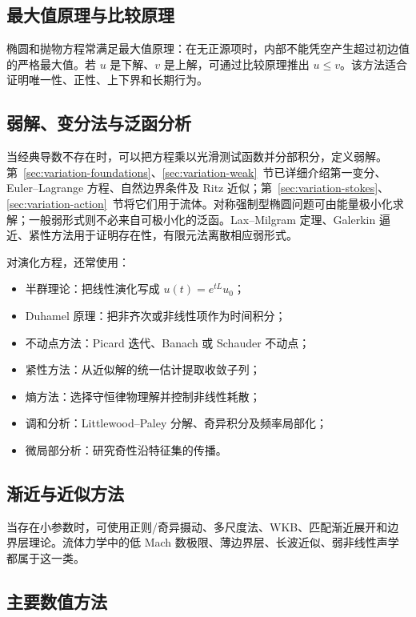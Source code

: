 \documentclass[cn,hazy,blue,11pt,normal]{elegantnote}
\numberwithin{equation}{section}
\begin{document}
\subsection{最大值原理与比较原理}

椭圆和抛物方程常满足最大值原理：在无正源项时，内部不能凭空产生超过初边值的严格最大值。若 $u$ 是下解、$v$ 是上解，可通过比较原理推出 $u\le v$。该方法适合证明唯一性、正性、上下界和长期行为。

\subsection{弱解、变分法与泛函分析}

当经典导数不存在时，可以把方程乘以光滑测试函数并分部积分，定义弱解。第~\ref{sec:variation-foundations}、\ref{sec:variation-weak}~节已详细介绍第一变分、Euler--Lagrange 方程、自然边界条件及 Ritz 近似；第~\ref{sec:variation-stokes}、\ref{sec:variation-action}~节将它们用于流体。对称强制型椭圆问题可由能量极小化求解；一般弱形式则不必来自可极小化的泛函。Lax--Milgram 定理、Galerkin 逼近、紧性方法用于证明存在性，有限元法离散相应弱形式。

对演化方程，还常使用：
\begin{itemize}
 \item 半群理论：把线性演化写成 $u(t)=e^{tL}u_0$；
 \item Duhamel 原理：把非齐次或非线性项作为时间积分；
 \item 不动点方法：Picard 迭代、Banach 或 Schauder 不动点；
 \item 紧性方法：从近似解的统一估计提取收敛子列；
 \item 熵方法：选择守恒律物理解并控制非线性耗散；
 \item 调和分析：Littlewood--Paley 分解、奇异积分及频率局部化；
 \item 微局部分析：研究奇性沿特征集的传播。
\end{itemize}

\subsection{渐近与近似方法}

当存在小参数时，可使用正则/奇异摄动、多尺度法、WKB、匹配渐近展开和边界层理论。流体力学中的低 Mach 数极限、薄边界层、长波近似、弱非线性声学都属于这一类。

\subsection{主要数值方法}
\end{document}
